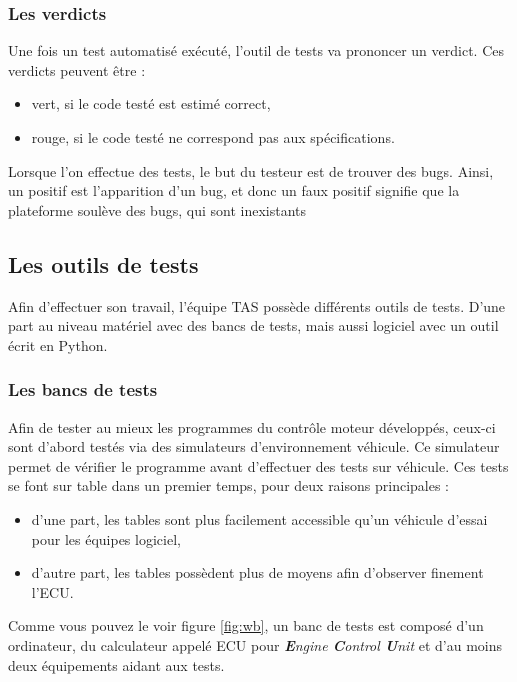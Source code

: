 \subsubsection{Les verdicts}
Une fois un test automatisé exécuté, l'outil de tests va prononcer un verdict. Ces verdicts peuvent être :
\begin{itemize}
	\item vert, si le code testé est estimé correct,
	\item rouge, si le code testé ne correspond pas aux spécifications.
\end{itemize}

Lorsque l'on effectue des tests, le but du testeur est de trouver des bugs. Ainsi, un positif est l'apparition d'un bug, et donc un faux positif signifie que la plateforme soulève des bugs, qui sont inexistants

\subsection{Les outils de tests}
Afin d'effectuer son travail, l'équipe TAS possède différents outils de tests. D'une part au niveau matériel avec des bancs de tests, mais aussi logiciel avec un outil écrit en Python.

\subsubsection{Les bancs de tests}\label{wb}
Afin de tester au mieux les programmes du contrôle moteur développés, ceux-ci sont d'abord testés via des simulateurs d'environnement véhicule. Ce simulateur permet de vérifier le programme avant d'effectuer des tests sur véhicule. Ces tests se font sur table dans un premier temps, pour deux raisons principales : 
\begin{itemize}
	\item d'une part, les tables sont plus facilement accessible qu'un véhicule d'essai pour les équipes logiciel,
	\item d'autre part, les tables possèdent plus de moyens afin d'observer finement l'ECU.
\end{itemize}		
Comme vous pouvez le voir figure \ref{fig:wb}, un banc de tests est composé d'un ordinateur, du calculateur appelé ECU pour \textit{\textbf{E}ngine \textbf{C}ontrol \textbf{U}nit} et d'au moins deux équipements aidant aux tests. 


